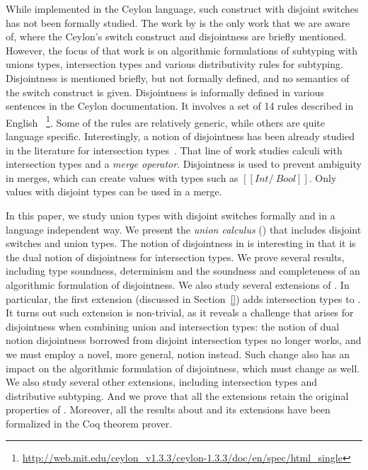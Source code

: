 While implemented in the Ceylon language, such construct
with disjoint switches has not been formally studied.
The work by \citet{muehlboeck2018empowering} is the only work that we are aware of,
where the Ceylon's switch construct
and disjointness are briefly mentioned. However, the focus 
of that work is on algorithmic formulations of subtyping
with unions types, intersection types and various distributivity
rules for subtyping. Disjointness is mentioned briefly, but not
formally defined, and no semantics of the switch construct is given.
Disjointness is informally defined in various sentences in the
Ceylon documentation. It involves a set of 14 rules described in English
~\footnote{\url{http://web.mit.edu/ceylon_v1.3.3/ceylon-1.3.3/doc/en/spec/html_single}}. Some of the rules are relatively generic, while
others are quite language specific. 
Interestingly, a notion
of disjointness has been already studied in the literature
for intersection types~\cite{oliveira2016disjoint}. That line of work studies calculi
with intersection types and a \textit{merge operator}. Disjointness
is used to prevent ambiguity in merges, which can create
values with types such as $[[Int /\ Bool]]$. Only values
with disjoint types can be used in a merge.

In this paper, we study union types with disjoint switches formally
and in a language independent way. We present the \emph{union
  calculus} (\cal) that includes disjoint switches and union types.
The notion of disjointness in \cal is interesting in that it is
the dual notion of disjointness for intersection types.
We prove several results, including type soundness, determinism
and the soundness and completeness of an algorithmic formulation
of disjointness.
We also study several extensions of \cal. In particular,
the first extension (discussed in Section~\ref{}) adds intersection
types to \cal. It turns out such extension is non-trivial, as it reveals
a challenge that arises for disjointness when combining
union and intersection types:
the notion of dual notion disjointness borrowed from
disjoint intersection types no longer works, and we must employ
a novel, more general, notion instead. Such change also has an impact
on the algorithmic formulation of disjointness, which must change as
well. We also study several other extensions, including intersection
types and distributive subtyping. And we prove that all the extensions retain
the original properties of \cal. Moreover, all the results about \cal and its
extensions have been formalized in the Coq theorem prover.

